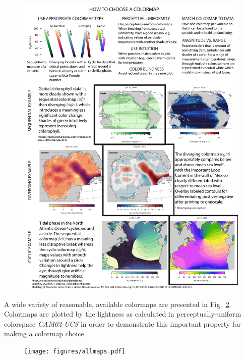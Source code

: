 \documentclass[10pt,journal,compsoc]{IEEEtran}
\begin{document}
\begin{figure}
	\includegraphics[width=\textwidth]{figures/howtochoose.pdf}
	\caption{}
	\label{fig:howtochoose}
\end{figure}
\nocite{chlor}
\nocite{ssh}
\nocite{egbert2002efficient}




A wide variety of reasonable, available colormaps are presented in Fig.~\ref{fig:allmaps}. Colormaps are plotted by the lightness as calculated in perceptually-uniform colorspace \textit{CAM02-UCS} in order to demonstrate this important property for making a colormap choice.

\begin{figure}
	\texttt{[image: figures/allmaps.pdf]}
	\caption{}
	\label{fig:allmaps}
\end{figure}
\nocite{hunter2007matplotlib}
\nocite{nunez2018optimizing}
\nocite{cubehelix}
\nocite{twilight}
\nocite{matlab}
\nocite{mycarta}
\nocite{light2004end}
\nocite{brewer}
\nocite{crameri2018geodynamic}
\end{document}
